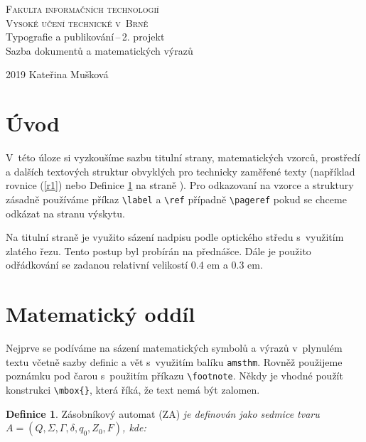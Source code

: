 \documentclass[11pt, a4paper, twocolumn]{article}
\theoremstyle{definition}
\newtheorem{definice}{Definice}
\theoremstyle{remark}
\theoremstyle{plain}
\begin{document}
\begin{titlepage}

\begin{center}
	\Huge \textsc{Fakulta informačních technologií \\%
	Vysoké učení technické v~Brně}\\
	\huge Typografie a publikování\,--\,2. projekt\\
	\huge Sazba dokumentů a matematických výrazů
\end{center}

{\Large 2019 \hfill Kateřina Mušková}
\end{titlepage}

\section*{Úvod}
V~této úloze si vyzkoušíme sazbu titulní strany, matematic\-kých vzorců, prostředí a dalších textových struktur obvyklých pro technicky zaměřené texty (například rovnice (\ref{r1}) nebo Definice \ref{d1} na straně \pageref{d1}). Pro odkazovaní na vzorce
a struktury zásadně používáme příkaz \verb|\label| a \verb|\ref| případně \verb|\pageref| pokud se chceme odkázat na stranu
výskytu.

Na titulní straně je využito sázení nadpisu podle optického středu s~vy\-uži\-tím zlatého řezu. Tento postup byl probírán na přednášce. Dále je použito odřádkování se
zadanou relativní velikostí 0.4 em a 0.3 em.

\section{Matematický oddíl}
Nejprve se podíváme na sázení matematických symbolů a výrazů v~plynulém textu včetně sazby definic a vět s~využitím balíku \verb|amsthm|. Rovněž použijeme poznámku pod čarou s~použitím příkazu \verb|\footnote|. Někdy je vhodné použít konstrukci \verb|\mbox{}|, která říká, že text nemá být zalomen.

\begin{definice}
\label{d1} Zásobníkový automat (ZA) \emph{je definován jako
sedmice tvaru $A = (Q, \Sigma, \Gamma, \delta, q_0, Z_0, F)$, kde:}
\end{definice}
\end{document}
